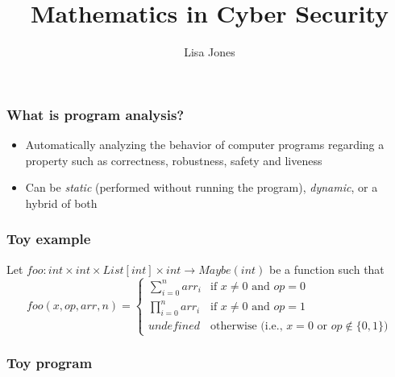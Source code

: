 \documentclass[11pt,table]{beamer}
\begin{document}
\author{Lisa Jones}
\title{Mathematics in Cyber Security}
\frame[plain]{\maketitle}



\begin{frame}
\frametitle{What is program analysis?}
  \begin{itemize}
  \item{ Automatically analyzing the behavior of computer programs regarding a property such as correctness, robustness, safety and liveness}
    \medskip
  \item{Can be \textit{static} (performed without running the program), \textit{dynamic}, or a hybrid of both}
      \end{itemize}
  \end{frame}

\begin{frame}
  \frametitle{Toy example}

  Let $ foo: int \times int \times List[int] \times int \to Maybe(int) $
  be a function such that
  \[
  foo(x, op, arr, n) = \begin{cases}
    \sum_{i=0}^{n} arr_i & \mbox{if } x \neq 0 \mbox{ and } op=0 \\
    \prod_{i=0}^{n} arr_i & \mbox{if } x \neq 0 \mbox{ and } op=1 \\
    undefined & \mbox{otherwise (i.e., } x=0 \mbox{ or } op \not\in \{0, 1\})
  \end{cases}
  \]
  
  \end{frame}

\begin{frame}[fragile]
  \frametitle{Toy program}
  
  \end{frame}
\end{document}

